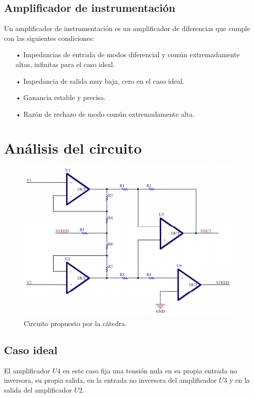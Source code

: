 \subsection{Amplificador de instrumentación}
Un amplificador de instrumentación es un amplificador de diferencias que cumple con las siguientes condiciones:
\begin{itemize}
\item[•] Impedancias de entrada de modos diferencial y común extremadamente altas, infinitas para el caso ideal.
\item[•] Impedancia de salida muy baja, cero en el caso ideal.
\item[•] Ganancia estable y precisa.
\item[•] Razón de rechazo de modo común extremadamente alta.
\end{itemize}

\section{Análisis del circuito}
\begin{figure}[H]
\centering
\includegraphics[scale=0.7]{../Ex3/circcatedra.png}
\caption{Circuito propuesto por la cátedra.}
\label{fig:circcatedra}
\end{figure}

\subsection{Caso ideal}
	El amplificador $\mathit{U4}$ en este caso fija una tensión nula en su propia entrada no inversora, su propia salida, en la entrada no inversora del amplificador $\mathit{U3}$ y en la salida del amplificador $\mathit{U2}$.

